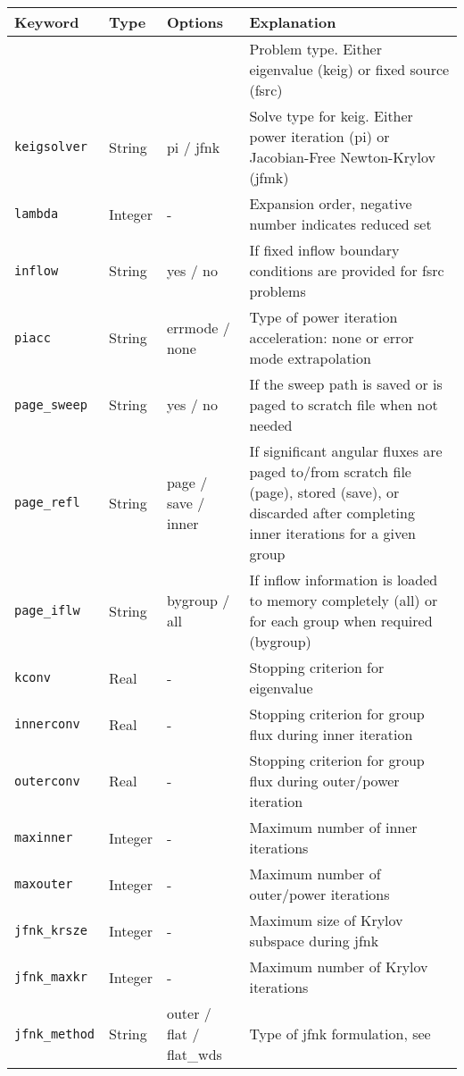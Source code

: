 \begin{longtable}[H]{l l l l}
    \toprule
    Keyword & Type & Options & Explanation\\
    \midrule
        &    &   & Problem type. Either eigenvalue (keig) or fixed source (fsrc) \\ \hline
    \verb"keigsolver" & String & pi / jfnk  & Solve type for keig. Either power iteration (pi) or Jacobian-Free Newton-Krylov (jfmk) \\ \hline
    \verb"lambda" & Integer & - & Expansion order, negative number indicates reduced set \\ \hline
    \verb"inflow" & String  & yes / no & If fixed inflow boundary conditions are provided for fsrc problems\\ \hline
    \verb"piacc" & String & errmode / none & Type of power iteration acceleration: none or error mode extrapolation \\ \hline
    \verb"page_sweep" & String & yes / no & If the sweep path is saved or is paged to scratch file when not needed\\ \hline
    \verb"page_refl" & String & page / save / inner & If significant angular fluxes are paged to/from scratch file (page), stored (save), or discarded after completing inner iterations for a given group\\ \hline
    \verb"page_iflw" & String  & bygroup / all & If inflow information is loaded to memory completely (all) or for each group when required (bygroup)\\ \hline
    \verb"kconv" & Real & - & Stopping criterion for eigenvalue\\ \hline
    \verb"innerconv" & Real & - & Stopping criterion for group flux during inner iteration \\ \hline
    \verb"outerconv" & Real & - & Stopping criterion for group flux during outer/power iteration \\ \hline
    \verb"maxinner" & Integer & - & Maximum number of inner iterations \\ \hline
    \verb"maxouter" & Integer & - & Maximum number of outer/power iterations \\ \hline
    \verb"jfnk_krsze" & Integer & - & Maximum size of Krylov subspace during jfnk \\ \hline
    \verb"jfnk_maxkr" &Integer & - & Maximum number of Krylov iterations\\ \hline
    \verb"jfnk_method" & String & outer / flat / flat\_wds & Type of jfnk formulation, see~\cite{}\\ \hline

\end{longtable}
